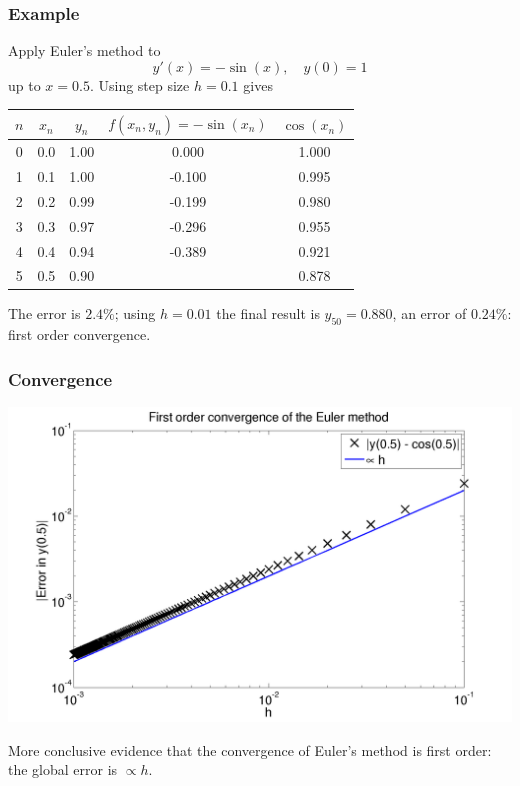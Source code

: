 \documentclass{beamer}
\begin{document}
\begin{frame}
  \frametitle{Example}

  Apply Euler's method to
  \begin{equation*}
    y'(x) = - \sin(x), \quad y(0) = 1
  \end{equation*}
  up to $x = 0.5$. Using step size $h = 0.1$ gives
  \begin{center}
    \begin{tabular}{c|c c c c}
      $n$ & $x_n$ & $y_n$ & $f(x_n, y_n) = -\sin(x_n)$ & $\cos(x_n)$ \\
      \hline
      0 & 0.0 & 1.00  &  0.000 & 1.000 \\
      1 & 0.1 & 1.00  & -0.100 & 0.995 \\
      2 & 0.2 & 0.99  & -0.199 & 0.980 \\
      3 & 0.3 & 0.97  & -0.296 & 0.955 \\
      4 & 0.4 & 0.94  & -0.389 & 0.921 \\
      5 & 0.5 & 0.90  &        & 0.878
    \end{tabular}
  \end{center} \pause
  The error is $2.4\%$; using $h = 0.01$ the final result is $y_{50} =
  0.880$, an error of $0.24\%$: first order convergence.

\end{frame}

\begin{frame}
  \frametitle{Convergence}

  \begin{center}
    \includegraphics[height=0.7\textheight]{figures/EulerSinConvergence}
  \end{center}
   More conclusive evidence that the convergence of Euler's method is
   first order: the global error is $\propto h$.

\end{frame}
\end{document}
